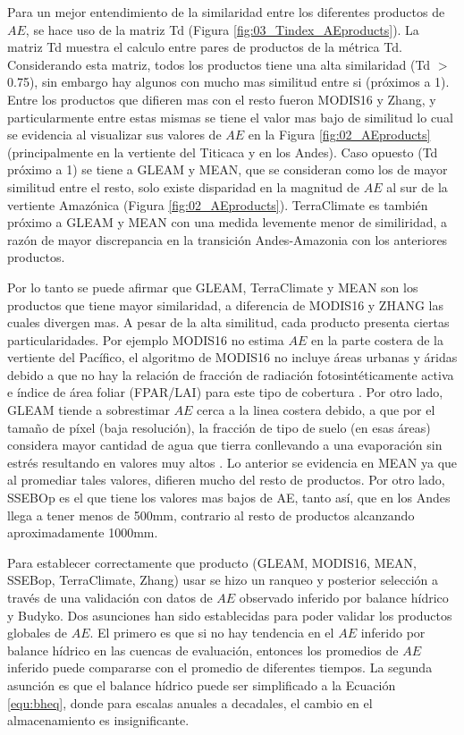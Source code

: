 \documentclass[12pt]{article}
\begin{document}


Para un mejor entendimiento de la similaridad entre los diferentes productos de $AE$, se hace uso de la matriz Td (Figura \ref{fig:03_Tindex_AEproducts}). La matriz Td muestra el calculo entre pares de productos de la métrica Td. Considerando esta matriz, todos los productos tiene una alta similaridad (Td $>$ 0.75), sin embargo hay algunos con mucho mas similitud entre si (próximos a 1). Entre los productos que difieren mas con el resto fueron MODIS16 y Zhang, y particularmente entre estas mismas se tiene el valor mas bajo de similitud lo cual se evidencia al visualizar sus valores de $AE$ en la Figura \ref{fig:02_AEproducts} (principalmente en la vertiente del Titicaca y en los Andes). Caso opuesto (Td próximo a 1) se tiene a GLEAM y MEAN, que se consideran como los de mayor similitud entre el resto, solo existe disparidad en la magnitud de $AE$ al sur de la vertiente Amazónica (Figura \ref{fig:02_AEproducts}). TerraClimate es también próximo a GLEAM y MEAN con una medida levemente menor de similiridad, a razón de mayor discrepancia en la transición Andes-Amazonia con los anteriores productos.

Por lo tanto se puede afirmar que GLEAM, TerraClimate y MEAN son los productos que tiene mayor similaridad, a diferencia de MODIS16 y ZHANG las cuales divergen mas. A pesar de la alta similitud, cada producto presenta ciertas particularidades. Por ejemplo MODIS16 no estima $AE$ en la parte costera de la vertiente del Pacífico, el algoritmo de MODIS16 no incluye áreas urbanas y áridas debido a que no hay la relación de fracción de radiación fotosintéticamente activa e índice de área foliar (FPAR/LAI) para este tipo de cobertura \citep{mu2013modis}. Por otro lado, GLEAM tiende a sobrestimar $AE$ cerca a la linea costera debido, a que por el tamaño de píxel (baja resolución), la fracción de tipo de suelo (en esas áreas) considera mayor cantidad de agua que tierra conllevando a una evaporación sin estrés resultando en valores muy altos \citep{Martens2017}. Lo anterior se evidencia en MEAN ya que al promediar tales valores, difieren mucho del resto de productos. Por otro lado, SSEBOp es el que tiene los valores mas bajos de AE, tanto así, que en los Andes llega a tener menos de 500mm, contrario al resto de productos alcanzando aproximadamente 1000mm.



Para establecer correctamente que producto (GLEAM, MODIS16, MEAN, SSEBop, TerraClimate, Zhang) usar se hizo un ranqueo y posterior selección a través de una validación con datos de $AE$ observado inferido por balance hídrico y Budyko. Dos asunciones han sido establecidas para poder validar los productos globales de $AE$. El primero es que si no hay tendencia en el $AE$ inferido por balance hídrico en las cuencas de evaluación, entonces los promedios de $AE$ inferido puede compararse con el promedio de diferentes tiempos. La segunda asunción es que el balance hídrico puede ser simplificado a la Ecuación \ref{equ:bheq}, donde para escalas anuales a decadales, el cambio en el almacenamiento es insignificante.
\end{document}
